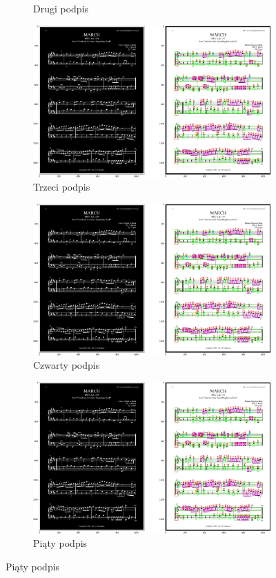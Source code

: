 \documentclass[12pt]{article}
\begin{document}
\begin{figure}[h!]
\begin{subfigure}[b]{0.32\linewidth}
			\caption{Drugi podpis}
		\end{subfigure}
		\begin{subfigure}[b]{0.32\linewidth}
			\includegraphics[width=\linewidth]{zdjs/Zdj0.png}
			\caption{Trzeci podpis}
		\end{subfigure}
	
		\begin{subfigure}[b]{0.48\linewidth}
			\includegraphics[width=\linewidth]{zdjs/Zdj0.png}
			\caption{Czwarty podpis}
		\end{subfigure}
		\begin{subfigure}[b]{0.48\linewidth}
			\includegraphics[width=\linewidth]{zdjs/Zdj0.png}
			\caption{Piąty podpis}
	\end{subfigure}
	\end{figure}
\end{document}
